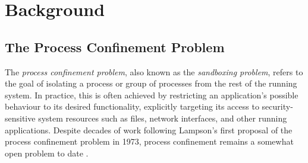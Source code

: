 \section{Background}

\subsection{The Process Confinement Problem}

The \textit{process confinement problem}, also known as the \textit{sandboxing problem}, refers to the goal of isolating a process or group of processes from the rest of the running system. In practice, this is often achieved by restricting an application's possible behaviour to its desired functionality, explicitly targeting its access to security-sensitive system resources such as files, network interfaces, and other running applications.  Despite decades of work following Lampson's \cite{lampson1973_a_note} first proposal of the process confinement problem in 1973, process confinement remains a somewhat open problem to date \cite{crowell2013_confinement_problem}.


